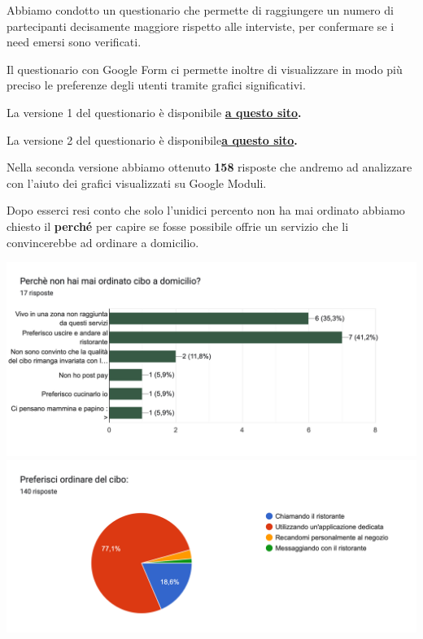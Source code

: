 \documentclass{article}
\begin{document}
    \vspace{2cm} \par 
    \vspace{0.5cm}
\par Abbiamo condotto un questionario che permette di raggiungere un numero di partecipanti decisamente maggiore rispetto alle interviste, per confermare se i need emersi sono verificati.\par Il questionario con Google Form ci permette inoltre di visualizzare in modo più preciso le preferenze degli utenti tramite grafici significativi.
\par La versione 1 del questionario è disponibile \textbf{\href{https://forms.gle/pBWCBfAxsjULCZRj6}{a questo sito}.}
\par La versione 2 del questionario è disponibile\textbf{\href{https://docs.google.com/forms/d/1ToAwRVi9a8q0_68hbEI7O8ORtodt_uTHuwU9ZtPfk1Q/edit}{a questo sito}.}
\par \vspace{1cm}
Nella seconda versione abbiamo ottenuto \textbf{158} risposte che andremo ad analizzare con l'aiuto dei grafici visualizzati su Google Moduli.
\par Dopo esserci resi conto che solo l'unidici percento non ha mai ordinato abbiamo chiesto il \textbf{perché} per capire se fosse possibile offrie un servizio che li convincerebbe ad ordinare a domicilio.
\vspace{0.5cm}
\par 
\includegraphics[width=\textwidth]{Data/Grafici/Perche_non_ordina.png}
\includegraphics[width=\textwidth]{Data/Grafici/ordinare_cibo.png}
\end{document}
